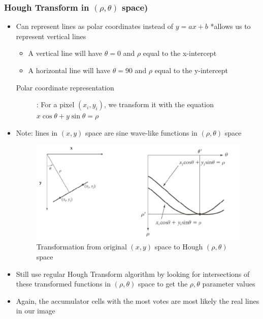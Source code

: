 \documentclass[letterpaper,12pt]{article}
\begin{document}
\subsubsection{Hough Transform in $(\rho, \theta)$ space)}
\begin{itemize}
 \item Can represent lines as polar coordinates instead of $y=ax + b$ *allows us to represent vertical lines
       \begin{itemize}
        \item A vertical line will have $\theta=0$ and $\rho$ equal to the x-intercept
        \item A horizontal line will have $\theta=90$ and $\rho$ equal to the y-intercept
       \end{itemize}
       \begin{description}
        \item[Polar coordinate representation]: For a pixel $(x_i,y_i)$, we transform it with the equation $x\cos\theta + y\sin\theta = \rho$
       \end{description}
 \item Note: lines in $(x,y)$ space are sine wave-like functions in $(\rho, \theta)$ space
       \begin{figure}[H]
        \centering
        \includegraphics[width=\textwidth]{images/hough_transform_rho_theta.png}
        \caption{Transformation from original $(x,y)$ space to Hough $(\rho,\theta)$ space}
       \end{figure}
 \item Still use regular Hough Transform algorithm by looking for intersections of these transformed functions in $(\rho, \theta)$ space to get the $\rho,\theta$ parameter values
 \item Again, the accumulator cells with the most votes are most likely the real lines in our image
\end{itemize}
\end{document}
